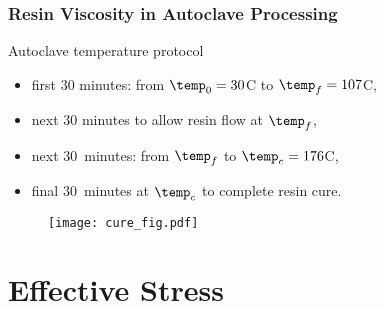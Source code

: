 \documentclass[compress]{beamer}%
\begin{document}
\begin{frame}
  \frametitle{Resin Viscosity in Autoclave Processing}
  Autoclave temperature protocol
  \begin{itemize}
  \item first $30$ minutes: from $\temp_0=30$\degree C to $\temp_f=107$\degree C,
  \item next $30$ minutes to allow resin flow at $\temp_f$,
  \item next $30$~minutes: from $\temp_f$ to $\temp_c=176$\degree C,
  \item final $30$~minutes at $\temp_c$ to complete resin cure.
  \end{itemize}
\begin{figure}
  \centering
  \texttt{[image: cure\_fig.pdf]}
  \label{fig:cure-exp}
\end{figure}

\end{frame}

\section{Effective Stress}
\end{document}
